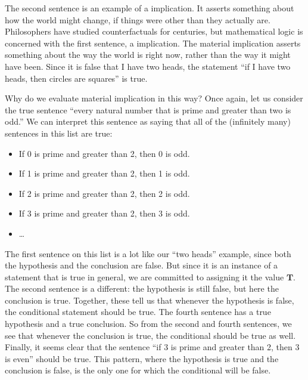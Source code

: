 \documentclass[letterpaper,10pt,english]{sphinxmanual}
\begin{document}
\sphinxAtStartPar
The second sentence is an example of a  implication. It asserts something about how the world might change, if things were other than they actually are. Philosophers have studied counterfactuals for centuries, but mathematical logic is concerned with the first sentence, a  implication. The material implication asserts something about the way the world is right now, rather than the way it might have been. Since it is false that I have two heads, the statement “if I have two heads, then circles are squares” is true.

\sphinxAtStartPar
Why do we evaluate material implication in this way? Once again, let us consider the true sentence “every natural number that is prime and greater than two is odd.” We can interpret this sentence as saying that all of the (infinitely many) sentences in this list are true:
\begin{itemize}
\item {} 
\sphinxAtStartPar
If 0 is prime and greater than 2, then 0 is odd.

\item {} 
\sphinxAtStartPar
If 1 is prime and greater than 2, then 1 is odd.

\item {} 
\sphinxAtStartPar
If 2 is prime and greater than 2, then 2 is odd.

\item {} 
\sphinxAtStartPar
If 3 is prime and greater than 2, then 3 is odd.

\item {} 
\sphinxAtStartPar
…

\end{itemize}

\sphinxAtStartPar
The first sentence on this list is a lot like our “two heads” example, since both the hypothesis and the conclusion are false. But since it is an instance of a statement that is true in general, we are committed to assigning it the value \(\mathbf{T}\). The second sentence is a different: the hypothesis is still false, but here the conclusion is true. Together, these tell us that whenever the hypothesis is false, the conditional statement should be true. The fourth sentence has a true hypothesis and a true conclusion. So from the second and fourth sentences, we see that whenever the conclusion is true, the conditional should be true as well. Finally, it seems clear that the sentence “if 3 is prime and greater than 2, then 3 is even” should  be true. This pattern, where the hypothesis is true and the conclusion is false, is the only one for which the conditional will be false.
\end{document}
